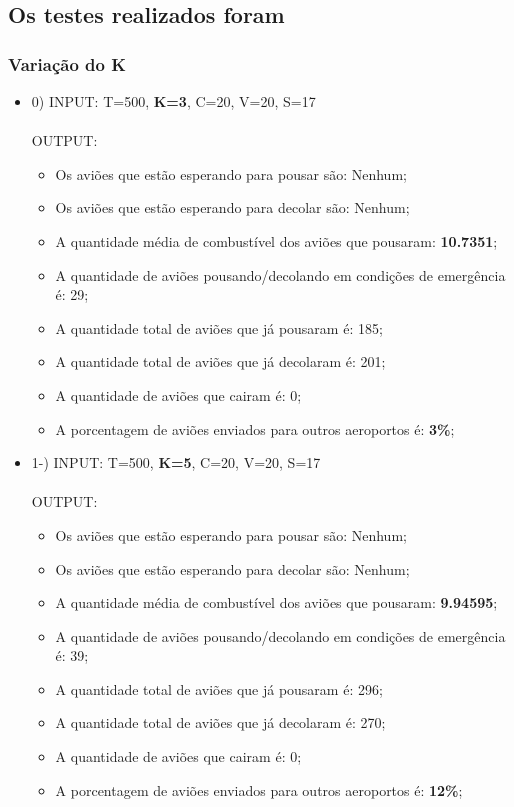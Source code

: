\documentclass{article}
\begin{document}
\newpage
\subsection{Os testes realizados foram}
\subsubsection{Variação do K}

\begin{itemize}
   \item 0) INPUT: T=500, \textbf{K=3}, C=20, V=20, S=17 \\\\
   OUTPUT: 
   \begin{itemize}
      \item Os aviões que estão esperando para pousar são: Nenhum;
      \item Os aviões que estão esperando para decolar são: Nenhum;
      \item A quantidade média de combustível dos aviões que pousaram: \textbf{10.7351};
      \item A quantidade de aviões pousando/decolando em condições de emergência é: 29;
      \item A quantidade total de aviões que já pousaram é: 185;
      \item A quantidade total de aviões que já decolaram é: 201;
      \item A quantidade de aviões que cairam é: 0;
      \item A porcentagem de aviões enviados para outros aeroportos é: \textbf{3\%};
   \end{itemize}
\end{itemize}

\hline

\begin{itemize}
   \item 1-) INPUT: T=500, \textbf{K=5}, C=20, V=20, S=17\\\\
   OUTPUT: 
   \begin{itemize}
      \item Os aviões que estão esperando para pousar são: Nenhum;
      \item Os aviões que estão esperando para decolar são: Nenhum;
      \item A quantidade média de combustível dos aviões que pousaram: \textbf{9.94595};
      \item A quantidade de aviões pousando/decolando em condições de emergência é: 39;
      \item A quantidade total de aviões que já pousaram é: 296;
      \item A quantidade total de aviões que já decolaram é: 270;
      \item A quantidade de aviões que cairam é: 0;
      \item A porcentagem de aviões enviados para outros aeroportos é: \textbf{12\%};
   \end{itemize} 
\end{itemize}
  
\end{document}
